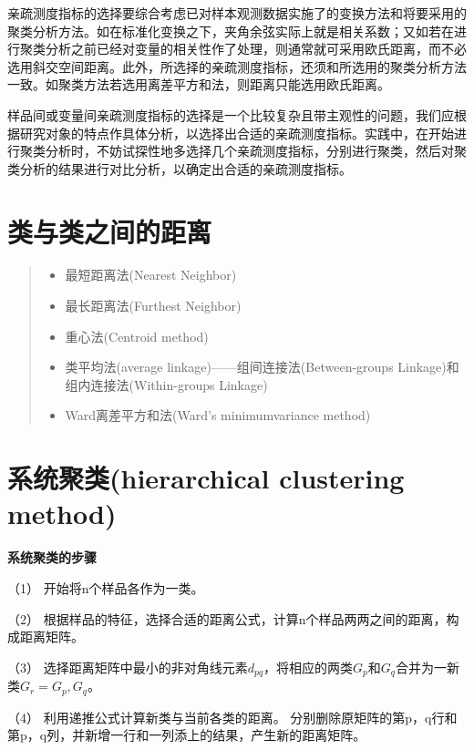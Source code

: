 \documentclass[]{ctexbook}
\providecommand{\tightlist}{%
  \setlength{\itemsep}{0pt}\setlength{\parskip}{0pt}}
\begin{document}
亲疏测度指标的选择要综合考虑已对样本观测数据实施了的变换方法和将要采用的聚类分析方法。如在标准化变换之下，夹角余弦实际上就是相关系数；又如若在进行聚类分析之前已经对变量的相关性作了处理，则通常就可采用欧氏距离，而不必选用斜交空间距离。此外，所选择的亲疏测度指标，还须和所选用的聚类分析方法一致。如聚类方法若选用离差平方和法，则距离只能选用欧氏距离。

样品间或变量间亲疏测度指标的选择是一个比较复杂且带主观性的问题，我们应根据研究对象的特点作具体分析，以选择出合适的亲疏测度指标。实践中，在开始进行聚类分析时，不妨试探性地多选择几个亲疏测度指标，分别进行聚类，然后对聚类分析的结果进行对比分析，以确定出合适的亲疏测度指标。

\hypertarget{ux7c7bux4e0eux7c7bux4e4bux95f4ux7684ux8dddux79bb}{%
\section{类与类之间的距离}\label{ux7c7bux4e0eux7c7bux4e4bux95f4ux7684ux8dddux79bb}}

\begin{quote}
\begin{itemize}
\tightlist
\item
  最短距离法(Nearest Neighbor)
\item
  最长距离法(Furthest Neighbor)
\item
  重心法(Centroid method)
\item
  类平均法(average linkage)------组间连接法(Between-groups Linkage)和组内连接法(Within-groups Linkage)
\item
  Ward离差平方和法(Ward's minimumvariance method)
\end{itemize}
\end{quote}

\hypertarget{ux7cfbux7edfux805aux7c7bhierarchical-clustering-method}{%
\section{系统聚类(hierarchical clustering method)}\label{ux7cfbux7edfux805aux7c7bhierarchical-clustering-method}}

\textbf{系统聚类的步骤}

（1） 开始将n个样品各作为一类。

（2） 根据样品的特征，选择合适的距离公式，计算n个样品两两之间的距离，构成距离矩阵。

（3） 选择距离矩阵中最小的非对角线元素\(d_{pq}\)，将相应的两类\(G_p\)和\(G_q\)合并为一新类\(G_r={G_p,G_q}\)。

（4） 利用递推公式计算新类与当前各类的距离。 分别删除原矩阵的第p，q行和第p，q列，并新增一行和一列添上的结果，产生新的距离矩阵。
\end{document}
